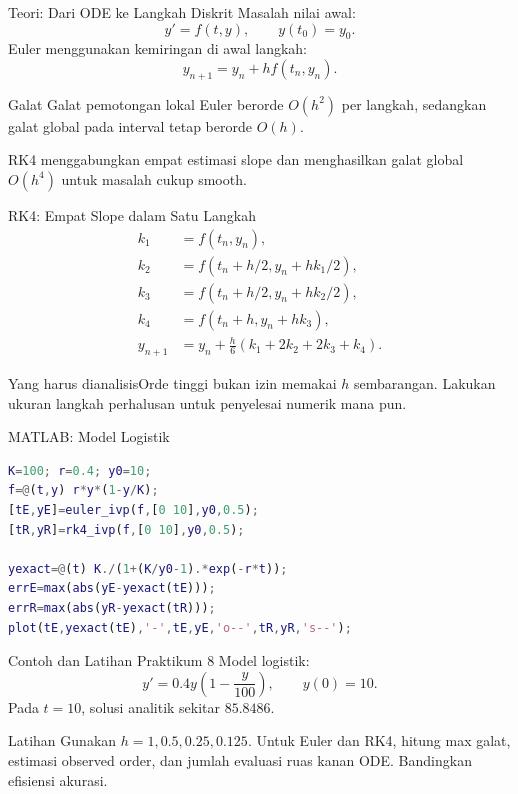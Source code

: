 \documentclass[slides,english,noindex,lean,nobackpage,nocopyright,noupdate,nosummary]{enacom}
\newcommand{\AnalysisBox}[1]{\begin{alertblock}{Yang harus dianalisis}#1\end{alertblock}}
\begin{document}
\begin{frame}{Teori: Dari ODE ke Langkah Diskrit}
Masalah nilai awal:
\[
y'=f(t,y),\qquad y(t_0)=y_0.
\]
Euler menggunakan kemiringan di awal langkah:
\[
y_{n+1}=y_n+h f(t_n,y_n).
\]
\begin{block}{Galat}
Galat pemotongan lokal Euler berorde $O(h^2)$ per langkah, sedangkan galat global pada interval tetap berorde $O(h)$.
\end{block}
RK4 menggabungkan empat estimasi slope dan menghasilkan galat global $O(h^4)$ untuk masalah cukup smooth.
\end{frame}

\begin{frame}{RK4: Empat Slope dalam Satu Langkah}
\[
\begin{aligned}
k_1&=f(t_n,y_n),\\
k_2&=f(t_n+h/2,y_n+hk_1/2),\\
k_3&=f(t_n+h/2,y_n+hk_2/2),\\
k_4&=f(t_n+h,y_n+hk_3),\\
y_{n+1}&=y_n+\frac h6(k_1+2k_2+2k_3+k_4).
\end{aligned}
\]
\AnalysisBox{Orde tinggi bukan izin memakai $h$ sembarangan. Lakukan ukuran langkah perhalusan untuk penyelesai numerik mana pun.}
\end{frame}

\begin{frame}{MATLAB: Model Logistik}
\begin{lstlisting}[language=Matlab]
K=100; r=0.4; y0=10;
f=@(t,y) r*y*(1-y/K);
[tE,yE]=euler_ivp(f,[0 10],y0,0.5);
[tR,yR]=rk4_ivp(f,[0 10],y0,0.5);

yexact=@(t) K./(1+(K/y0-1).*exp(-r*t));
errE=max(abs(yE-yexact(tE)));
errR=max(abs(yR-yexact(tR)));
plot(tE,yexact(tE),'-',tE,yE,'o--',tR,yR,'s--');
\end{lstlisting}
\end{frame}

\begin{frame}{Contoh dan Latihan Praktikum 8}
Model logistik:
\[
y'=0.4y\left(1-\frac{y}{100}\right),\qquad y(0)=10.
\]
Pada $t=10$, solusi analitik sekitar $85.8486$.
\begin{exampleblock}{Latihan}
Gunakan $h=1,0.5,0.25,0.125$. Untuk Euler dan RK4, hitung max galat, estimasi observed order, dan jumlah evaluasi ruas kanan ODE. Bandingkan efisiensi akurasi.
\end{exampleblock}
\end{frame}

\end{document}
